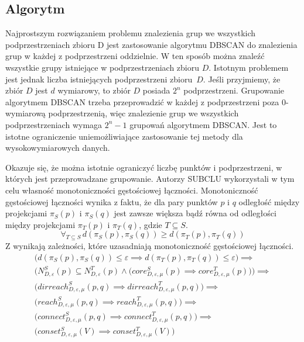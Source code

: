 \subsection{Algorytm}
Najprostszym rozwiązaniem problemu znalezienia grup we wszystkich podprzestrzeniach zbioru D jest zastosowanie algorytmu DBSCAN do znalezienia grup w każdej z podprzestrzeni oddzielnie. W ten sposób można znaleźć wszystkie grupy istniejące w podprzestrzeniach zbioru $ D $. Istotnym problemem jest jednak liczba istniejących podprzestrzeni \mbox{zbioru $ D $}. Jeśli przyjmiemy, że zbiór $ D $ jest $ d $ wymiarowy, to zbiór $ D $ posiada $ 2^n $ podprzestrzeni. Grupowanie algorytmem DBSCAN trzeba przeprowadzić w każdej z podprzestrzeni poza $ 0 $-wymiarową podprzestrzenią, więc znalezienie grup we wszystkich podprzestrzeniach wymaga $ 2^n-1 $ grupowań algorytmem DBSCAN. Jest to istotne ograniczenie uniemożliwiające zastosowanie tej metody dla wysokowymiarowych danych.

Okazuje się, że można istotnie ograniczyć liczbę punktów i podprzestrzeni, w których jest przeprowadzane grupowanie. Autorzy SUBCLU wykorzystali w tym celu własność monotoniczności gęstościowej łączności. Monotoniczność gęstościowej łączności wynika z faktu, że dla pary punktów $ p $ i $ q $ odległość między projekcjami $ \pi_S(p) $ i $ \pi_S(q) $ jest zawsze większa bądź równa od odległości między projekcjami $ \pi_T(p) $ i $ \pi_T(q) $, gdzie $ T \subseteq S $. 
\begin{equation}\label{eq:d-vs-d-projected}
\forall_{T\subseteq S}\,d(\pi_S(p),\pi_S(q)) \geq d(\pi_T(p), \pi_T(q))
\end{equation}
Z  wynikają zależności, które uzasadniają monotoniczność gęstościowej łączności.
\begin{equation}
	\begin{array}{l}
		\big(d(\pi_S(p),\pi_S(q)) \le \varepsilon \implies d(\pi_T(p), \pi_T(q)) \le \varepsilon\big) \implies\\
		\big(N^S_{D,\varepsilon}(p) \subseteq N^T_{D,\varepsilon}(p) \land \big(core^S_{D,\varepsilon,\mu}(p) \implies core^T_{D,\varepsilon,\mu}(p)\big)\big) \implies \\
		\big(dirreach^S_{D,\varepsilon,\mu}(p, q) \implies dirreach^T_{D,\varepsilon,\mu}(p, q)\big) \implies \\
		\big(reach^S_{D,\varepsilon,\mu}(p, q) \implies reach^T_{D,\varepsilon,\mu}(p, q)\big) \implies \\
		\big(connect^S_{D,\varepsilon,\mu}(p, q) \implies connect^T_{D,\varepsilon,\mu}(p, q)\big) \implies \\
		\big(conset^S_{D,\varepsilon,\mu}(V) \implies conset^T_{D,\varepsilon,\mu}(V)\big)
	\end{array}
\end{equation}

